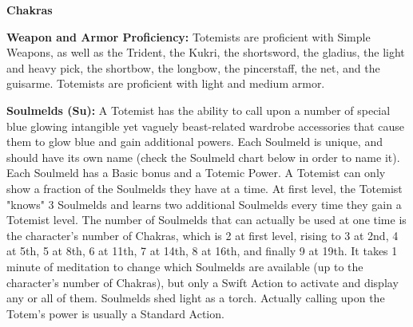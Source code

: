 \begin{extraclasstable}{\textbf{Chakras}}
\end{extraclasstable}

\classfeatures

\textbf{Weapon and Armor Proficiency:} Totemists are proficient with Simple Weapons, as well as the Trident, the Kukri, the shortsword, the gladius, the light and heavy pick, the shortbow, the longbow, the pincerstaff, the net, and the guisarme. Totemists are proficient with light and medium armor. 

\textbf{Soulmelds (Su):} A Totemist has the ability to call upon a number of special blue glowing intangible yet vaguely beast-related wardrobe accessories that cause them to glow blue and gain additional powers. Each Soulmeld is unique, and should have its own name (check the Soulmeld chart below in order to name it). Each Soulmeld has a Basic bonus and a Totemic Power. A Totemist can only show a fraction of the Soulmelds they have at a time. At first level, the Totemist "knows" 3 Soulmelds and learns two additional Soulmelds every time they gain a Totemist level. The number of Soulmelds that can actually be used at one time is the character's number of Chakras, which is 2 at first level, rising to 3 at 2nd, 4 at 5th, 5 at 8th, 6 at 11th, 7 at 14th, 8 at 16th, and finally 9 at 19th. It takes 1 minute of meditation to change which Soulmelds are available (up to the character's number of Chakras), but only a Swift Action to activate and display any or all of them. Soulmelds shed light as a torch. Actually calling upon the Totem's power is usually a Standard Action. 

